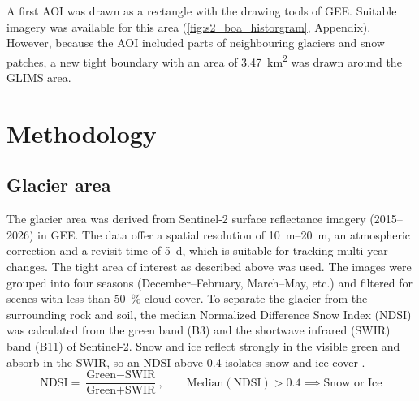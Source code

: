 \documentclass{article}
\begin{document}
A first AOI was drawn as a rectangle with the drawing tools of GEE. Suitable imagery was available for this area (\autoref{fig:s2_boa_historgram}, Appendix). However, because the AOI included parts of neighbouring glaciers and snow patches, a new tight boundary with an area of \qty{3.47}{\km\squared} was drawn around the GLIMS area.

\section{Methodology}

\subsection{Glacier area}
The glacier area was derived from Sentinel-2 surface reflectance imagery (\numrange{2015}{2026}) in GEE. The data offer a spatial resolution of \qtyrange{10}{20}{\m}, an atmospheric correction and a revisit time of \qty{5}{\day}, which is suitable for tracking multi-year changes. The tight area of interest as described above was used. The images were grouped into four seasons (December--February, March--May, etc.) and filtered for scenes with less than \qty{50}{\percent} cloud cover. To separate the glacier from the surrounding rock and soil, the median Normalized Difference Snow Index (NDSI) was calculated from the green band (B3) and the shortwave infrared (SWIR) band (B11) of Sentinel-2. Snow and ice reflect strongly in the visible green and absorb in the SWIR, so an NDSI above \num{0.4} isolates snow and ice cover \citep{Dozier1989, Hall1995}.
\begin{equation}
    \mathrm{NDSI} = \frac{\text{Green} - \text{SWIR}}  {\text{Green} + \text{SWIR}},\qquad \mathrm{Median}(\mathrm{NDSI}) > \num{0.4} \implies \text{Snow or Ice}
    \label{eq:NDSI}
\end{equation}
\end{document}

